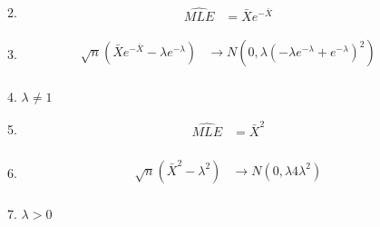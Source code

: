 \documentclass{article}
\begin{document}
\begin{enumerate}
\begin{enumerate}
\begin{equation*}
		\end{equation*}
	\item
		\begin{equation*}
		\begin{split}
		\hat{MLE} & = \bar{X}e^{-\bar{X}}
		\end{split}
		\end{equation*}
	\item
		\begin{equation*}
		\begin{split}
		\sqrt{n} (\bar{X}e^{-\bar{X}} - \lambda e^{-\lambda}) &  \rightarrow N(0,\lambda(-\lambda e^{-\lambda}+e^{-\lambda})^{2} )\\
		\end{split}
		\end{equation*}
	\item
	$\lambda \neq 1$
	\item
		\begin{equation*}
		\begin{split}
		\hat{MLE} & = \bar{X}^{2} \\
		\end{split}
		\end{equation*}
	\item
		\begin{equation*}
		\begin{split}
		\sqrt{n} (\bar{X}^{2} - \lambda^{2}) &  \rightarrow N(0, \lambda 4 \lambda ^{2})\\
		\end{split}
		\end{equation*}
	\item
	$\lambda > 0 $
	\end{enumerate}
\end{enumerate}
\end{document}
